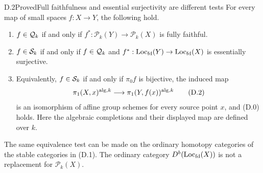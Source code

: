 \begin{claim}{D.2}{Proved}{Full faithfulness and essential surjectivity are different tests}
\label{D2}
For every map of small spaces $f:X\to Y$, the following hold.
\begin{enumerate}
\item $f\in\mathcal Q_k$ if and only if $f^*:\mathcal P_k(Y)\to\mathcal P_k(X)$
is fully faithful.
\item $f\in\mathcal S_k$ if and only if $f\in\mathcal Q_k$ and
$f^*:\operatorname{Loc}_{\mathrm{fd}}(Y)\to\operatorname{Loc}_{\mathrm{fd}}(X)$ is essentially surjective.
\item Equivalently, $f\in\mathcal S_k$ if and only if $\pi_0f$ is bijective,
the induced map
\[
 \pi_1(X,x)^{\mathrm{alg},k}\longrightarrow\pi_1(Y,f(x))^{\mathrm{alg},k}
 \tag{D.2}
\]
is an isomorphism of affine group schemes for every source point $x$,
and (D.0) holds. Here the algebraic completions and their displayed map
are defined over $k$.
\end{enumerate}
The same equivalence test can be made on the ordinary homotopy categories
of the stable categories in (D.1). The ordinary category
$D^b(\operatorname{Loc}_{\mathrm{fd}}(X))$ is not a replacement for $\mathcal P_k(X)$.
\end{claim}
